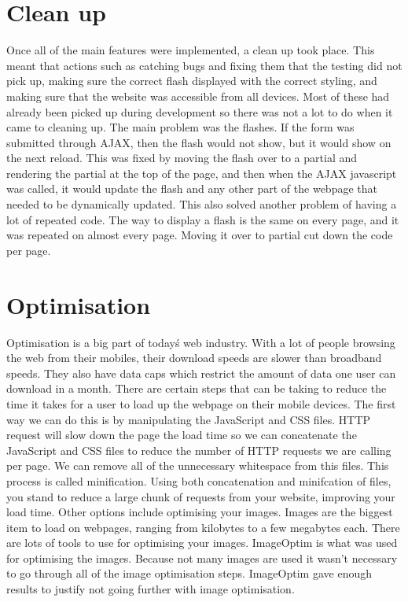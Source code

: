 \section{Clean up}
Once all of the main features were implemented, a clean up took place. This meant that actions such as catching bugs and fixing them that the testing did not pick up, making sure the correct flash displayed with the correct styling, and making sure that the website was accessible from all devices. Most of these had already been picked up during development so there was not a lot to do when it came to cleaning up. The main problem was the flashes. If the form was submitted through AJAX, then the flash would not show, but it would show on the next reload. This was fixed by moving the flash over to a partial and rendering the partial at the top of the page, and then when the AJAX javascript was called, it would update the flash and any other part of the webpage that needed to be dynamically updated. This also solved another problem of having a lot of repeated code. The way to display a flash is the same on every page, and it was repeated on almost every page. Moving it over to partial cut down the code per page.\\

\section{Optimisation}
Optimisation is a big part of today\'s web industry. With a lot of people browsing the web from their mobiles, their download speeds are slower than broadband speeds. They also have data caps which restrict the amount of data one user can download in a month. There are certain steps that can be taking to reduce the time it takes for a user to load up the webpage on their mobile devices. The first way we can do this is by manipulating the JavaScript and CSS files. HTTP request will slow down the page the load time so we can concatenate the JavaScript and CSS files to reduce the number of HTTP requests we are calling per page. We can remove all of the unnecessary whitespace from this files. This process is called minification. Using both concatenation and minifcation of files, you stand to reduce a large chunk of requests from your website, improving your load time. Other options include optimising your images. Images are the biggest item to load on webpages, ranging from kilobytes to a few megabytes each. There are lots of tools to use for optimising your images. ImageOptim \citep{imageoptim:2014} is what was used for optimising the images. Because not many images are used it wasn't necessary to go through all of the image optimisation steps. ImageOptim gave enough results to justify not going further with image optimisation.\\


